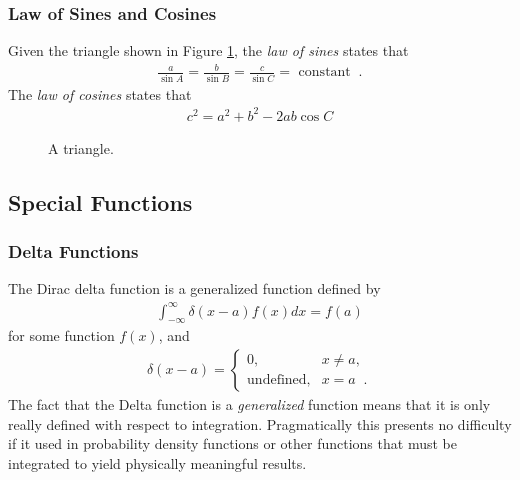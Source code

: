 \documentclass[11pt]{article}
\begin{document}
\subsubsection{Law of Sines and Cosines}
\label{sec:orgheadline37}
Given the triangle shown in Figure \ref{fig::triangle}, the \emph{law of sines} states that
\begin{align}
  \frac{a}{\sin A} = \frac{b}{\sin B} = \frac{c}{\sin C} = \text{ constant} \;\;.
\end{align}
The \emph{law of cosines} states that
\begin{align}
  c^2 = a^2 + b^2 - 2ab\cos{C}
\end{align}

\begin{figure}
\centering
{}
\caption{A triangle.}
\label{fig::triangle}
\end{figure}
\subsection{Special Functions}
\label{sec:orgheadline41}
\subsubsection{Delta Functions}
\label{sec:orgheadline39}
The Dirac delta function is a generalized function defined by
\begin{align}
  \int_{-\infty}^\infty \delta(x-a) f(x) dx = f(a)
\end{align}
for some function \(f(x)\), and
\begin{align}
  \delta(x-a) = 
  \begin{cases}
    0, & x\neq a, \\
    \text{undefined}, & x=a \;\;.
  \end{cases}
\end{align}
The fact that the Delta function is a \emph{generalized} function means that it is only really defined with respect to integration.  Pragmatically this presents no difficulty if it used in probability density functions or other functions that must be integrated to yield physically meaningful results.
\end{document}

